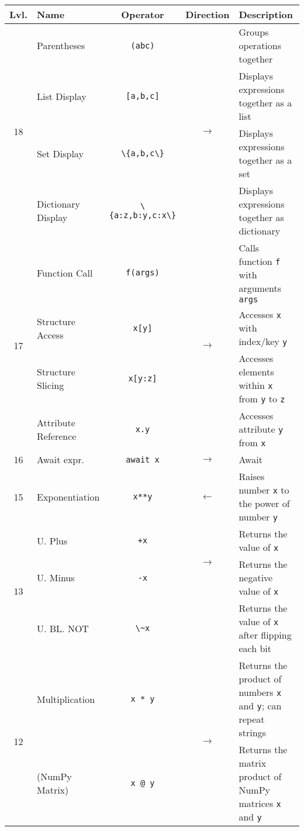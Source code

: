 \documentclass{article}
\begin{document}
\begin{center}\begin{tabularx}{\textwidth}{clccX}\toprule
  Lvl. & \quad Name & Operator & Direction & \qquad Description \\\midrule
  \multirow{4}{*}{18} & Parentheses & \lstinline|(abc)| & \multirow{4}{*}{\(\to\)} & Groups operations together \\
                      & List Display & \lstinline|[a,b,c]| & & Displays expressions together as a list\\
                      & Set Display & \lstinline|\{a,b,c\}| & & Displays expressions together as a set\\
                      & Dictionary Display & \lstinline|\{a:z,b:y,c:x\}| & & Displays expressions together as dictionary\\\midrule
  \multirow{4}{*}{17} & Function Call & \lstinline|f(args)| & \multirow{4}{*}{\(\to\)} & Calls function \lstinline|f| with arguments \lstinline|args|\\
                      & Structure Access & \lstinline|x[y]| & & Accesses \lstinline|x| with index/key \lstinline|y|\\
                      & Structure Slicing & \lstinline|x[y:z]| & & Accesses elements within \lstinline|x| from \lstinline|y| to \lstinline|z|\\
                      & Attribute Reference & \lstinline|x.y| & & Accesses attribute \lstinline|y| from \lstinline|x|\\\midrule
  16 & Await expr. & \lstinline|await x| & \(\to\) & Await\\\midrule
  15 & Exponentiation & \lstinline|x**y| & \(\gets\) & Raises number \lstinline|x| to the power of number \lstinline|y|\\\midrule
  \multirow{3}{*}{13} & U. Plus & \lstinline|+x| & \multirow{2}{*}{\(\to\)} & Returns the value of \lstinline|x|\\
                      & U. Minus          & \lstinline|-x|  & & Returns the negative value of \lstinline|x|\\
                      & U. BL. NOT        & \lstinline|\~x| & & Returns the value of \lstinline|x| after flipping each bit\\\midrule
  \multirow{5}{*}{12} & Multiplication & \lstinline|x * y| & \multirow{2}{*}{\(\to\)} & Returns the product of numbers \lstinline|x| and \lstinline|y|; can repeat strings\\
                      & (NumPy Matrix) & \lstinline|x @ y| & & Returns the matrix product of NumPy matrices \lstinline|x| and \lstinline|y|\\

\end{tabularx}
\end{center}
\end{document}
